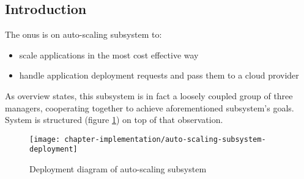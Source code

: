 \subsection{Introduction}
The onus is on auto-scaling subsystem to:
\begin{itemize}
 \item scale applications in the most cost effective way
 \item handle application deployment requests and pass them to a cloud provider 
\end{itemize}

As overview states, this subsystem is in fact a loosely coupled group of three managers, cooperating together to achieve aforementioned subsystem's goals. System is structured (figure \ref{fig:auto-scaling-subsystem-deployment}) on top of that observation.

\begin{figure}[!ht]
  \begin{center}
    \texttt{[image: chapter-implementation/auto-scaling-subsystem-deployment]}
  \end{center}
  \caption{Deployment diagram of auto-scaling subsystem}
  \label{fig:auto-scaling-subsystem-deployment}
\end{figure}


